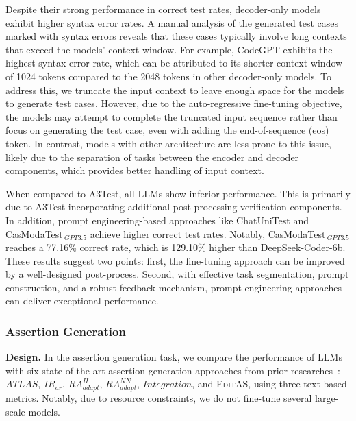Despite their strong performance in correct test rates, decoder-only models exhibit higher syntax error rates. A manual analysis of the generated test cases marked with syntax errors reveals that these cases typically involve long contexts that exceed the models’ context window. For example, CodeGPT exhibits the highest syntax error rate, which can be attributed to its shorter context window of 1024 tokens compared to the 2048 tokens in other decoder-only models. To address this, we truncate the input context to leave enough space for the models to generate test cases. However, due to the auto-regressive fine-tuning objective, the models may attempt to complete the truncated input sequence rather than focus on generating the test case, even with adding the end-of-sequence (eos) token. In contrast, models with other architecture are less prone to this issue, likely due to the separation of tasks between the encoder and decoder components, which provides better handling of input context.

When compared to A3Test, all LLMs show inferior performance. This is primarily due to A3Test incorporating additional post-processing verification components. In addition, prompt engineering-based approaches like ChatUniTest and CasModaTest$_{~GPT3.5}$ achieve higher correct test rates. Notably, CasModaTest$_{~GPT3.5}$ reaches a 77.16\% correct rate, which is 129.10\% higher than DeepSeek-Coder-6b. These results suggest two points: first, the fine-tuning approach can be improved by a well-designed post-process. Second, with effective task segmentation, prompt construction, and a robust feedback mechanism, prompt engineering approaches can deliver exceptional performance.



\subsubsection{Assertion Generation}
\textbf{Design.}
In the assertion generation task, we compare the performance of LLMs with six state-of-the-art assertion generation approaches from prior researches~\cite{watson_learning_2020, yu_automated_2022, sun_revisiting_2023}: $ATLAS$, $IR_{ar}$, $RA_{adapt}^H$, $RA_{adapt}^{NN}$, $Integration$, and \textsc{EditAS}, using three text-based metrics. Notably, due to resource constraints, we do not fine-tune several large-scale models.

